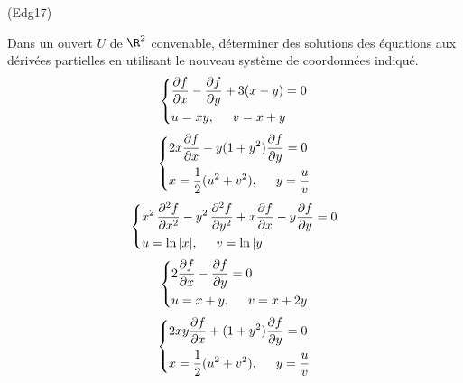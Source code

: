 \begin{tiny}(Edg17)\end{tiny} Dans un ouvert $U$ de $\R^2$ convenable, déterminer des solutions des équations aux dérivées partielles en utilisant le nouveau système de coordonnées indiqué.
\begin{displaymath}
\left\lbrace 
\begin{aligned}
 &\frac{\partial f}{\partial x } - \frac{\partial f}{\partial y } + 3(x-y)=0 \\
 &u=xy,\hspace{0.5cm} v = x+y
\end{aligned} 
\right. 
\end{displaymath}
\begin{displaymath}
\left\lbrace 
 \begin{aligned}
 &2x\frac{\partial f}{\partial x } - y(1+y^2)\frac{\partial f}{\partial y }=0 \\
 &x=\frac{1}{2}(u^2+v^2),\hspace{0.5cm} y = \frac{u}{v}
\end{aligned}
\right. 
\end{displaymath}
\begin{displaymath}
\left\lbrace 
 \begin{aligned}
 &x^2\,\frac{\partial^2 f}{\partial x^2 } - y^2\,\frac{\partial^2 f}{\partial y^2}
+x\frac{\partial f}{\partial x} -y\frac{\partial f}{\partial y}=0 \\
 &u=\ln|x|,\hspace{0.5cm} v = \ln|y|
\end{aligned}
\right. 
\end{displaymath}
\begin{displaymath}
\left\lbrace 
 \begin{aligned}
 &2\frac{\partial f}{\partial x} - \frac{\partial f}{\partial y}=0 \\
 &u= x+y,\hspace{0.5cm} v = x+2y
\end{aligned}
\right. 
\end{displaymath}
\begin{displaymath}
\left\lbrace 
 \begin{aligned}
 &2xy\frac{\partial f}{\partial x} +(1+y^2) \frac{\partial f}{\partial y}=0 \\
 &x= \frac{1}{2}(u^2+v^2),\hspace{0.5cm} y=\frac{u}{v}
\end{aligned}
\right. 
\end{displaymath}

